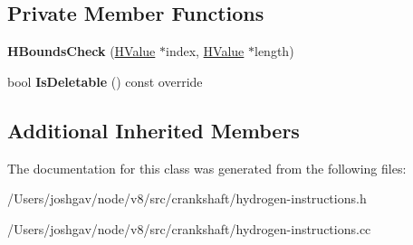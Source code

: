 \subsection*{Private Member Functions}
\begin{DoxyCompactItemize}
\item 
{\bfseries H\+Bounds\+Check} (\hyperlink{classv8_1_1internal_1_1_h_value}{H\+Value} $\ast$index, \hyperlink{classv8_1_1internal_1_1_h_value}{H\+Value} $\ast$length)\hypertarget{classv8_1_1internal_1_1_h_bounds_check_ae8be55569da2cf1ed3b18730d42389ef}{}\label{classv8_1_1internal_1_1_h_bounds_check_ae8be55569da2cf1ed3b18730d42389ef}

\item 
bool {\bfseries Is\+Deletable} () const  override\hypertarget{classv8_1_1internal_1_1_h_bounds_check_acb682a7b3f29d001c17b7b5f7c04658c}{}\label{classv8_1_1internal_1_1_h_bounds_check_acb682a7b3f29d001c17b7b5f7c04658c}

\end{DoxyCompactItemize}
\subsection*{Additional Inherited Members}


The documentation for this class was generated from the following files\+:\begin{DoxyCompactItemize}
\item 
/\+Users/joshgav/node/v8/src/crankshaft/hydrogen-\/instructions.\+h\item 
/\+Users/joshgav/node/v8/src/crankshaft/hydrogen-\/instructions.\+cc\end{DoxyCompactItemize}
